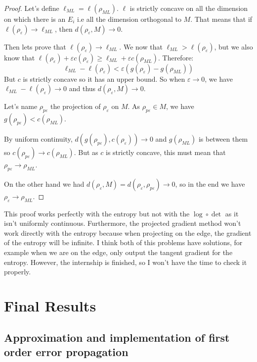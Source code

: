 \documentclass[10pt,a4paper]{report}
\theoremstyle{plain}
\theoremstyle{definition}
\theoremstyle{remark}
\renewcommand{\geq}{\geqslant}
\newcommand{\ml}{_{M\!L}}
\begin{document}
\begin{proof}
  Let's define $\ell\ml = \ell(\rho\ml)$.
  $\ell$ is strictly concave on all the dimension on which there is an $E_i$
  i.e all the dimension orthogonal to $M$. That means that if
  $\ell(\rho_\varepsilon) \to \ell\ml$, then $d(\rho_\varepsilon,M) \to 0$.

  Then lets prove that $\ell(\rho_\varepsilon) \to \ell\ml$. We now that
  $\ell\ml > \ell(\rho_\varepsilon)$, but we also know that
  $\ell(\rho_\varepsilon) + \varepsilon c(\rho_\varepsilon) \geq \ell\ml +
  \varepsilon c(\rho\ml)$. Therefore:
  \[\ell\ml - \ell(\rho_\varepsilon) < \varepsilon (g(\rho_\varepsilon) - g(\rho\ml))\]
  But $c$ is strictly concave so it has an upper bound. So when $\varepsilon \to
  0$, we have $\ell\ml - \ell(\rho_\varepsilon) \to 0$ and thus
  $d(\rho_\varepsilon,M)\to 0$.

  Let's name $\rho_{p\varepsilon}$ the projection of $\rho_\varepsilon$ on $M$.
  As $\rho_{p\varepsilon} \in M$, we have $g(\rho_{p\varepsilon}) < c(\rho\ml)$.

  By uniform continuity, $d(g(\rho_{p\varepsilon}),c(\rho_\varepsilon)) \to 0$
  and $g(\rho\ml)$ is between them so $c(\rho_{p\varepsilon}) \to c(\rho\ml)$.
  But as $c$ is strictly concave, this must mean that $\rho_{p\varepsilon} \to
  \rho\ml$.

  On the other hand we had $d(\rho_\varepsilon,M) =
  d(\rho_\varepsilon,\rho_{p\varepsilon}) \to 0$, so in the end we have
  $\rho_\varepsilon \to \rho\ml$.
\end{proof}

This proof works perfectly with the entropy but not with the $\log \circ \det$
as it isn't uniformly continuous. Furthermore, the projected gradient method won't
work directly with the entropy because when projecting on the edge, the gradient of the
entropy will be infinite. I think both of this problems have solutions, for
example when we are on the edge, only output the tangent gradient for the
entropy. However, the internship is finished, so I won't have the time to check
it properly.


\chapter{Final Results}

\section{Approximation and implementation of first order error propagation}
\end{document}
